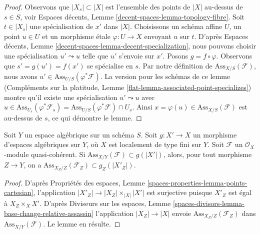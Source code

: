 \begin{proof}
Observons que $|X_s| \subset |X|$ est l'ensemble des points de $|X|$
au-dessus de $s \in S$, voir
Espaces décents, Lemme \ref{decent-spaces-lemma-topology-fibre}.
Soit $t \in |X_s|$ une spécialisation de $x'$ dans $|X|$.
Choisissons un schéma affine $U$, un point $u \in U$ et
un morphisme \'etale $\varphi : U \to X$ envoyant $u$ sur $t$.
D'après Espaces décents, Lemme \ref{decent-spaces-lemma-decent-specialization},
nous pouvons choisir une spécialisation $u' \leadsto u$
telle que $u'$ s'envoie sur $x'$. Posons $g = f \circ \varphi$.
Observons que $s' = g(u') = f(x')$ se spécialise en $s$.
Par notre définition de $\text{Ass}_{X/S}(\mathcal{F})$,
nous avons $u' \in \text{Ass}_{U/S}(\varphi^*\mathcal{F})$.
La version pour les schémas de ce lemme
(Compléments sur la platitude, Lemme \ref{flat-lemma-associated-point-specializes})
montre qu'il existe une spécialisation $u' \leadsto u$ avec
$u \in \text{Ass}_{U_s}(\varphi^*\mathcal{F}_s) =
\text{Ass}_{U/S}(\varphi^*\mathcal{F}) \cap U_s$.
Ainsi $x = \varphi(u) \in \text{Ass}_{X/S}(\mathcal{F})$
est au-dessus de $s$, ce qui démontre le lemme.
\end{proof}

\begin{lemma}
\label{lemma-contains-relative-ass-after-base-change}
Soit $Y$ un espace algébrique sur un schéma $S$. Soit $g : X' \to X$ un
morphisme d'espaces algébriques sur $Y$, où $X$ est localement de type fini sur $Y$.
Soit $\mathcal{F}$ un $\mathcal{O}_X$-module quasi-cohérent.
Si $\text{Ass}_{X/Y}(\mathcal{F}) \subset g(|X'|)$, alors, pour tout morphisme
$Z \to Y$, on a $\text{Ass}_{X_Z/Z}(\mathcal{F}_Z) \subset g_Z(|X'_Z|)$.
\end{lemma}

\begin{proof}
D'après Propriétés des espaces, Lemme \ref{spaces-properties-lemma-points-cartesian},
l'application $|X'_Z| \to |X_Z| \times_{|X|} |X'|$ est surjective puisque
$X'_Z$ est égal à $X_Z \times_X X'$.
D'après Diviseurs sur les espaces, Lemme
\ref{spaces-divisors-lemma-base-change-relative-assassin}
l'application $|X_Z| \to |X|$ envoie $\text{Ass}_{X_Z/Z}(\mathcal{F}_Z)$
dans $\text{Ass}_{X/Y}(\mathcal{F})$. Le lemme en résulte.
\end{proof}

